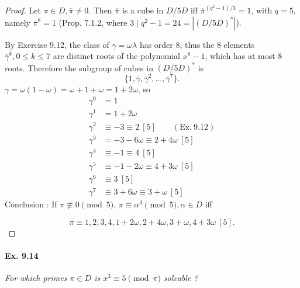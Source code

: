 \documentclass[11pt,a4paper]{article}
\begin{document}
\begin{proof}
Let $\pi \in D, \overline{\pi} \neq 0$. Then $\overline{\pi} $ is a cube in $D/5D$ iff $\overline{\pi}^{(q^2-1)/3} = 1$, with $q = 5$, namely $\overline{\pi}^8 = 1$ (Prop. 7.1.2, where $3 \mid q^2-1 = 24 = |(D/5D)^*| $).

By Exercise 9.12, the class of $\gamma = \omega \lambda$ has order 8, thus the 8 elements $\overline{\gamma}^k, 0 \leq k \leq 7$ are distinct roots of the polynomial $x^8-1$, which has at most 8 roots. Therefore  the subgroup of cubes in $(D/5D)^*$ is
$$\{1 ,\overline{\gamma}, \overline{\gamma}^2,\ldots, \overline{\gamma}^7\}.$$
$\gamma=\omega(1-\omega) = \omega+1+\omega = 1 + 2\omega$, so
\begin{align*}
\gamma^0 &= 1\\
\gamma^1 & = 1 + 2\omega\\
\gamma^2 &\equiv -3 \equiv 2\ [5]\qquad (\mathrm{Ex}.\ 9.12)\\
\gamma^3 &= -3 - 6\omega \equiv 2 + 4 \omega \ [5]\\
\gamma^4&\equiv -1 \equiv 4\ [5]\\
\gamma^5 &\equiv -1 - 2 \omega \equiv 4 + 3\omega\ [5]\\
\gamma^6 &\equiv 3 \ [5]\\
\gamma^7 &\equiv 3+6\omega \equiv 3 + \omega \ [5]
\end{align*}
Conclusion : If $\pi \not \equiv 0 \pmod 5$, $\pi \equiv \alpha^3 \pmod 5,\alpha \in D$ iff 

$$\pi \equiv 1,2,3,4,1+2\omega,2+4\omega,3+\omega,4+3\omega\ [5].$$ 
\end{proof}

\paragraph{Ex. 9.14}

{\it For which primes $\pi \in D$ is $x^3 \equiv 5 \pmod \pi$ solvable ?
}
\end{document}
